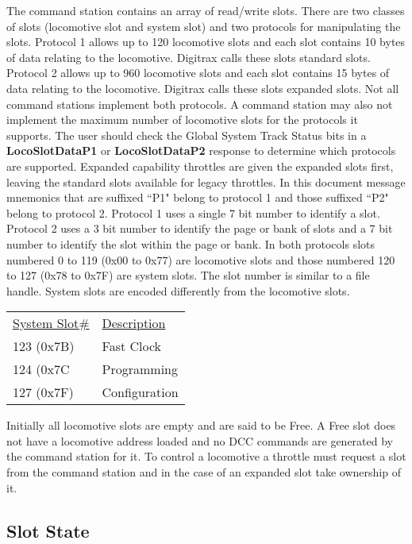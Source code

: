 The command station contains an array of read/write slots. There are two classes of slots (\gls{locomotive slot} and \gls{system slot}) and two protocols for manipulating the slots. Protocol 1 allows up to 120 locomotive slots and each slot contains 10 bytes of data relating to the locomotive. Digitrax calls these slots \gls{standard slots}. Protocol 2 allows up to 960 locomotive slots and each slot contains 15 bytes of data relating to the locomotive. Digitrax calls these slots \gls{expanded slots}. Not all command stations implement both protocols. A command station may also not implement the maximum number of locomotive slots for the protocols it supports.  The user should check the \gls{Global System Track Status} bits in a \textbf{LocoSlotDataP1} or \textbf{LocoSlotDataP2} response to determine which protocols are supported. Expanded capability throttles are given the expanded slots first, leaving the standard slots available for legacy throttles.  In this document message mnemonics that are suffixed ``P1" belong to protocol 1 and those suffixed ``P2" belong to protocol 2. Protocol 1 uses a single 7 bit number to identify a slot. Protocol 2 uses a 3 bit number to identify the page or bank of slots and a 7 bit number to identify the slot within the page or bank. In both protocols slots numbered 0 to 119 (0x00 to 0x77) are locomotive slots and those numbered 120 to 127 (0x78 to 0x7F) are system slots. The slot number is similar to a file handle. System slots are encoded differently from the locomotive slots. 

\begin{tabular}{l l}
\underline{System Slot\#} & \underline{Description}\\
123 (0x7B) & Fast Clock\\
124 (0x7C & Programming\\
127 (0x7F) & Configuration\\
\end{tabular}

Initially all locomotive slots are empty and are said to be \gls{Free}. A Free slot does not have a locomotive address loaded and no DCC commands are generated by the command station for it. To control a locomotive a \gls{throttle} must request a slot from the command station and in the case of an expanded slot take ownership of it.

\subsection{Slot State}

